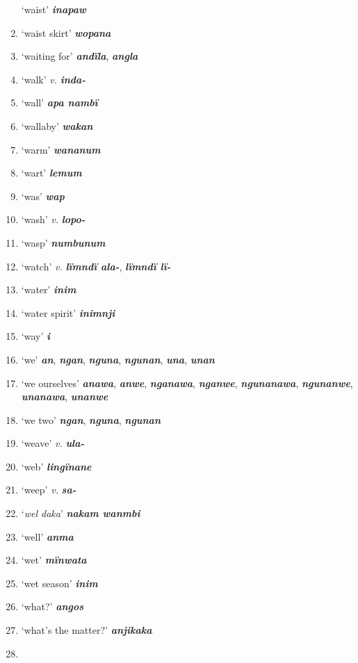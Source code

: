 \begin{enumerate}[noitemsep, label={}, align=left, widest=190, labelsep=1ex,leftmargin=*,itemindent=-10pt]
‘waist’ \textbf{\textit{inapaw}} \item
‘waist skirt’ \textbf{\textit{wopana}} \item
‘waiting for’ \textbf{\textit{andïla}}, \textbf{\textit{angla}} \item
‘walk’ \textit{v.} \textbf{\textit{inda-}} \item
‘wall’ \textbf{\textit{apa nambï}} \item
‘wallaby’ \textbf{\textit{wakan}} \item
‘warm’ \textbf{\textit{wananum}} \item
‘wart’ \textbf{\textit{lemum}} \item
‘was’ \textbf{\textit{wap}} \item
‘wash’ \textit{v.} \textbf{\textit{lopo-}} \item
‘wasp’ \textbf{\textit{numbunum}} \item
‘watch’ \textit{v.} \textbf{\textit{lïmndï ala-}}, \textbf{\textit{lïmndï lï-}} \item
‘water’ \textbf{\textit{inim}} \item
‘water spirit’ \textbf{\textit{inimnji}} \item
‘way’ \textbf{\textit{i}} \item
‘we’ \textbf{\textit{an}}, \textbf{\textit{ngan}}, \textbf{\textit{nguna}}, \textbf{\textit{ngunan}}, \textbf{\textit{una}}, \textbf{\textit{unan}} \item
‘we ourselves’ \textbf{\textit{anawa}}, \textbf{\textit{anwe}}, \textbf{\textit{nganawa}}, \textbf{\textit{nganwe}}, \textbf{\textit{ngunanawa}}, \textbf{\textit{ngunanwe}}, \linebreak \textbf{\textit{unanawa}}, \textbf{\textit{unanwe}} \item
‘we two’ \textbf{\textit{ngan}}, \textbf{\textit{nguna}}, \textbf{\textit{ngunan}} \item
‘weave’ \textit{v.} \textbf{\textit{ula-}} \item
‘web’ \textbf{\textit{lingïnane}} \item
‘weep’ \textit{v.} \textbf{\textit{sa-}} \item
‘\textit{wel daka}’ \textbf{\textit{nakam wanmbi}} \item
‘well’ \textbf{\textit{anma}} \item
‘wet’ \textbf{\textit{mïnwata}} \item
‘wet season’ \textbf{\textit{inim}} \item
‘what?’ \textbf{\textit{angos}} \item
‘what’s the matter?’ \textbf{\textit{anjikaka}} \item

\end{enumerate}
